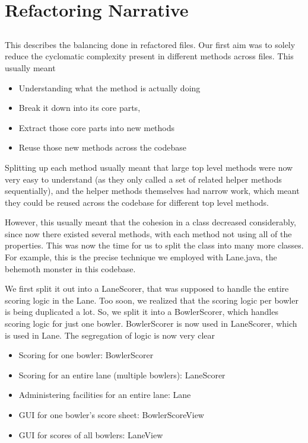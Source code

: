 \section{Refactoring Narrative}

\subsection{}

This describes the balancing done in refactored files. Our first aim was to solely reduce the cyclomatic complexity present in different methods across files. This usually meant

\begin{itemize}
    \item Understanding what the method is actually doing
    \item Break it down into its core parts,
    \item Extract those core parts into new methods
    \item Reuse those new methods across the codebase
\end{itemize}

Splitting up each method usually meant that large top level methods were now very easy to understand (as they only called a set of related helper methods sequentially), and the helper methods themselves had narrow work, which meant they could be reused across the codebase for different top level methods.

However, this usually meant that the cohesion in a class decreased considerably, since now there existed several methods, with each method not using all of the properties. This was now the time for us to split the class into many more classes. For example, this is the precise technique we employed with Lane.java, the behemoth monster in this codebase.

We first split it out into a LaneScorer, that was supposed to handle the entire scoring logic in the Lane. Too soon, we realized that the scoring logic per bowler is being duplicated a lot. So, we split it into a BowlerScorer, which handles scoring logic for just one bowler. BowlerScorer is now used in LaneScorer, which is used in Lane. The segregation of logic is now very clear

\begin{itemize}
    \item Scoring for one bowler: BowlerScorer
    \item Scoring for an entire lane (multiple bowlers): LaneScorer
    \item Administering facilities for an entire lane: Lane
    \item GUI for one bowler's score sheet: BowlerScoreView
    \item GUI for scores of all bowlers: LaneView
\end{itemize}

